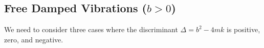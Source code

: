 \subsection{Free Damped Vibrations ($b > 0$)}
We need to consider three cases where the discriminant $\Delta = b^2 - 4mk$ is positive, zero, and negative. 





\ifodd{}\fi